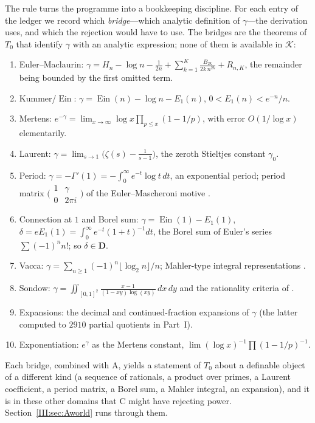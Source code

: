 \documentclass[11pt,a4paper]{article}
\newcommand{\Ein}{\operatorname{Ein}}
\newcommand{\DD}{\mathbf D}
\newcommand{\Th}{\mathcal K}
\newcommand{\Tz}{T_0}
\theoremstyle{definition}
\theoremstyle{remark}
\numberwithin{equation}{section}
\begin{document}
The rule turns the programme into a bookkeeping discipline. For each entry of the ledger
we record which \emph{bridge}---which analytic definition of $\gamma$---the derivation
uses, and which the rejection would have to use. The bridges are the theorems of $\Tz$
that identify $\gamma$ with an analytic expression; none of them is available in $\Th$:
\begin{enumerate}[label=(D\arabic*),leftmargin=*]
\item Euler--Maclaurin: $\gamma=H_n-\log n-\frac1{2n}+\sum_{k=1}^K\frac{B_{2k}}{2k\,n^{2k}}
+R_{n,K}$, the remainder being bounded by the first omitted term.
\item Kummer/$\Ein$: $\gamma=\Ein(n)-\log n-E_1(n)$, $0<E_1(n)<e^{-n}/n$.
\item Mertens: $e^{-\gamma}=\lim_{x\to\infty}\log x\prod_{p\le x}(1-1/p)$, with error
$O(1/\log x)$ elementarily.
\item Laurent: $\gamma=\lim_{s\to1}\bigl(\zeta(s)-\frac1{s-1}\bigr)$, the zeroth
Stieltjes constant $\gamma_0$.
\item Period: $\gamma=-\Gamma'(1)=-\int_0^\infty e^{-t}\log t\,dt$, an exponential
period; period matrix $\bigl(\begin{smallmatrix}1&\gamma\\0&2\pi i\end{smallmatrix}\bigr)$
of the Euler--Mascheroni motive \cite{FJ}.
\item Connection at $1$ and Borel sum: $\gamma=\Ein(1)-E_1(1)$,
$\delta=eE_1(1)=\int_0^\infty e^{-t}(1+t)^{-1}dt$, the Borel sum of Euler's series
$\sum(-1)^nn!$; so $\delta\in\DD$.
\item Vacca: $\gamma=\sum_{n\ge1}(-1)^n\lfloor\log_2n\rfloor/n$; Mahler-type integral
representations \cite{Rivoal2017}.
\item Sondow: $\gamma=\iint_{[0,1]^2}\frac{x-1}{(1-xy)\log(xy)}\,dx\,dy$ \cite{Sondow2005}
and the rationality criteria of \cite{Sondow}.
\item Expansions: the decimal and continued-fraction expansions of $\gamma$ (the latter
computed to $2910$ partial quotients in Part~I).
\item Exponentiation: $e^{\gamma}$ as the Mertens constant, $\lim(\log x)^{-1}\prod(1-1/p)^{-1}$.
\end{enumerate}
Each bridge, combined with $\mathrm A$, yields a statement of $\Tz$ about a definable
object of a different kind (a sequence of rationals, a product over primes, a Laurent
coefficient, a period matrix, a Borel sum, a Mahler integral, an expansion), and it is in
these other domains that $\mathrm C$ might have rejecting power. Section~\ref{III:sec:Aworld}
runs through them.
\end{document}
